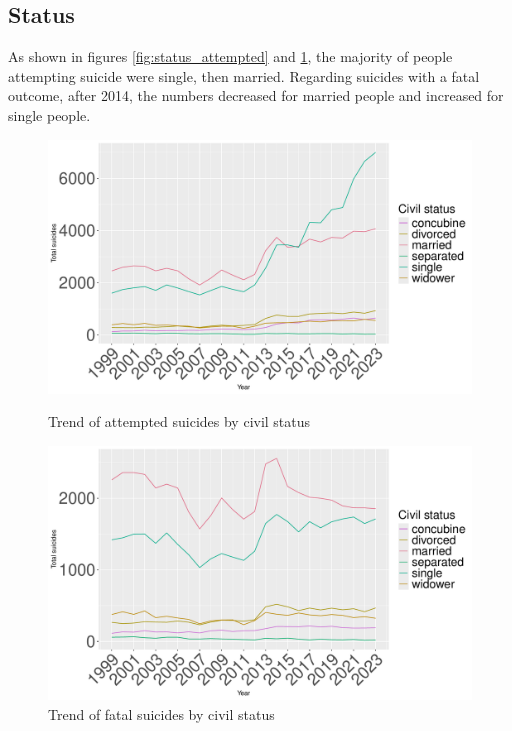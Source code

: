 \documentclass{article}
\begin{document}
\subsection{Status}
As shown in figures \ref{fig:status_attempted} and \ref{fig:status_fatal},
the majority of people attempting suicide were single, then married.
Regarding suicides with a fatal outcome, after 2014, the numbers decreased for married
people and increased for single people.
\begin{figure}[H]
    \centering
    \begin{minipage}{0.45\textwidth}
        \includegraphics[width=\textwidth]{imgs/status_attempted.pdf}
        \caption{Trend of attempted suicides by civil status }
	\label{fig:status_attempted}
    \end{minipage}
    \hfill
    \begin{minipage}{0.45\textwidth}
        \includegraphics[width=\textwidth]{imgs/status_fatal.pdf}
        \caption{Trend of fatal suicides by civil status }
	\label{fig:status_fatal}
    \end{minipage}
\end{figure}
\end{document}
